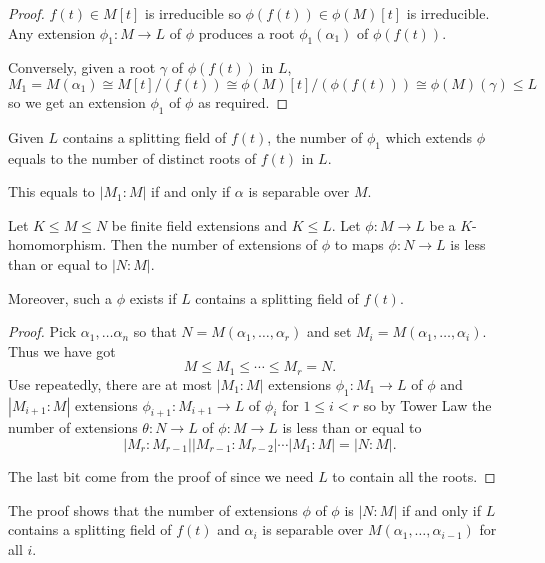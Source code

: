 \documentclass[a4paper]{article}
\begin{document}
\begin{proof}
  \(f(t) \in M[t]\) is irreducible so \(\phi(f(t)) \in \phi(M)[t]\) is irreducible. Any extension \(\phi_1: M \to L\) of \(\phi\) produces a root \(\phi_1(\alpha_1)\) of \(\phi(f(t))\).

  Conversely, given a root \(\gamma\) of \(\phi(f(t))\) in \(L\),
  \[
    M_1 = M(\alpha_1) \cong M[t]/(f(t)) \cong \phi(M)[t]/(\phi(f(t))) \cong \phi(M)(\gamma) \leq L
  \]
  so we get an extension \(\phi_1\) of \(\phi\) as required.
\end{proof}

\begin{corollary}
  Given \(L\) contains a splitting field of \(f(t)\), the number of \(\phi_1\) which extends \(\phi\) equals to the number of distinct roots of \(f(t)\) in \(L\).

  This equals to \(|M_1:M|\) if and only if \(\alpha\) is separable over \(M\).
\end{corollary}

\begin{corollary}
  \label{cor:homomorphic extension of finite extension}
  Let \(K \leq M \leq N\) be finite field extensions and \(K \leq L\). Let \(\phi: M \to L\) be a \(K\)-homomorphism. Then the number of extensions of \(\phi\) to maps \(\phi: N \to L\) is less than or equal to \(|N:M|\).

  Moreover, such a \(\phi\) exists if \(L\) contains a splitting field of \(f(t)\).
\end{corollary}

\begin{proof}
  Pick \(\alpha_1, \dots \alpha_n\) so that \(N = M(\alpha_1, \dots, \alpha_r)\) and set \(M_i = M(\alpha_1, \dots, \alpha_i)\). Thus we have got
  \[
    M \leq M_1 \leq \cdots \leq M_r = N.
  \]
  Use  repeatedly, there are at most \(|M_1:M|\) extensions \(\phi_1: M_1 \to L\) of \(\phi\) and \(|M_{i + 1}:M|\) extensions \(\phi_{i + 1}: M_{i + 1} \to L\) of \(\phi_i\) for \(1 \leq i < r\) so by Tower Law the number of extensions \(\theta: N \to L\) of \(\phi: M \to L\) is less than or equal to
  \[
    |M_r:M_{r - 1}||M_{r - 1}:M_{r - 2}|\cdots|M_1:M| = |N:M|.
  \]

  The last bit come from the proof of  since we need \(L\) to contain all the roots.
\end{proof}

\begin{remark}
  The proof shows that the number of extensions \(\phi\) of \(\phi\) is \(|N:M|\) if and only if \(L\) contains a splitting field of \(f(t)\) and \(\alpha_i\) is separable over \(M(\alpha_1, \dots, \alpha_{i - 1})\) for all \(i\).
\end{remark}
\end{document}
